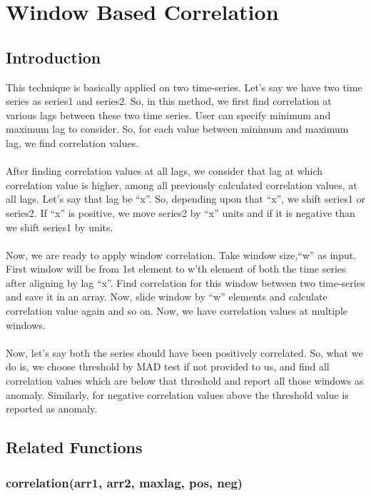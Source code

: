 \chapter{Window Based Correlation}
\label{appendix:correlation}
\section{Introduction}

This technique is basically applied on two time-series. Let's say we have two 
time series as series1 and series2. So, in this method, we first find 
correlation at various lags between these two time series. User can specify 
minimum and maximum lag to consider. So, for each value between minimum and maximum lag, we find correlation values.\\
\\
After finding correlation values at all lags, we consider that lag at which 
correlation value is higher, among all previously calculated correlation values, 
at all lags. Let's say that lag be ``x''. So, depending upon that ``x'', we 
shift series1 or series2. If ``x'' is positive, we move series2 by ``x'' units 
and if it is negative than we shift series1 by  units.\\
\\
Now, we are ready to apply window correlation. Take window size,``w'' as 
input. First window will be from 1st element to w'th element of both the time 
series after aligning by lag ``x''. Find correlation for this window between 
two time-series and save it in an array. Now, slide window by ``w'' elements 
and calculate correlation value again and so on. Now, we have correlation values at 
multiple windows.\\
\\
Now, let's say both the series should have been positively correlated. So, what 
we do is, we choose threshold by MAD test if not provided to us, and find all 
correlation values which are below that threshold and report all those windows 
as anomaly. Similarly, for negative correlation values above the threshold value is reported as anomaly.

\section{Related Functions}

\subsection{correlation(arr1, arr2, maxlag, pos, neg)}


